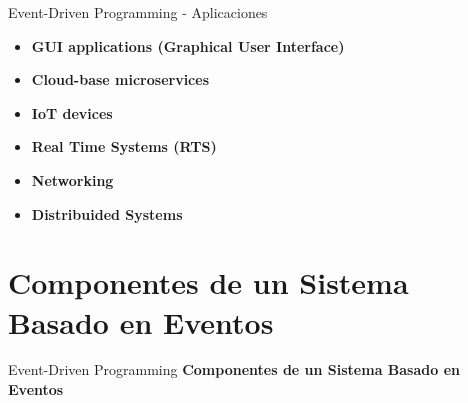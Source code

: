 \documentclass[11pt]{beamer}
\begin{document}
	\begin{frame}{Event-Driven Programming - Aplicaciones}
	\begin{itemize}
		\item \textbf{GUI applications (Graphical User Interface)}
		\item \textbf{Cloud-base microservices}
		\item \textbf{IoT devices} 
		\item \textbf{Real Time Systems (RTS)}
		\item \textbf{Networking}
		\item \textbf{Distribuided Systems}
	\end{itemize} 
	\end{frame}

	\section{Componentes de un Sistema Basado en Eventos}
	
	\begin{frame}{Event-Driven Programming}
		\huge \centering
		\textbf{Componentes de un Sistema Basado en Eventos}
	\end{frame}
\end{document}
